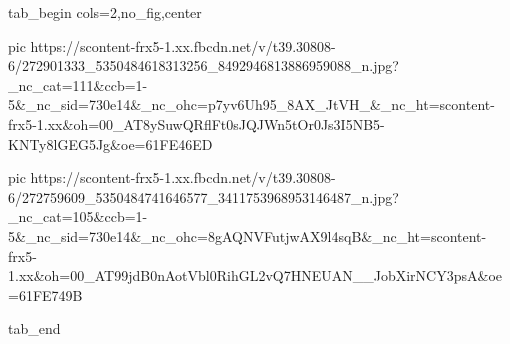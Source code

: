  
 
 
 
 


\ifcmt
  tab_begin cols=2,no_fig,center

     pic https://scontent-frx5-1.xx.fbcdn.net/v/t39.30808-6/272901333_5350484618313256_8492946813886959088_n.jpg?_nc_cat=111&ccb=1-5&_nc_sid=730e14&_nc_ohc=p7yv6Uh95_8AX_JtVH_&_nc_ht=scontent-frx5-1.xx&oh=00_AT8ySuwQRflFt0sJQJWn5tOr0Js3I5NB5-KNTy8lGEG5Jg&oe=61FE46ED

     pic https://scontent-frx5-1.xx.fbcdn.net/v/t39.30808-6/272759609_5350484741646577_3411753968953146487_n.jpg?_nc_cat=105&ccb=1-5&_nc_sid=730e14&_nc_ohc=8gAQNVFutjwAX9l4sqB&_nc_ht=scontent-frx5-1.xx&oh=00_AT99jdB0nAotVbl0RihGL2vQ7HNEUAN__JobXirNCY3psA&oe=61FE749B

  tab_end
\fi
